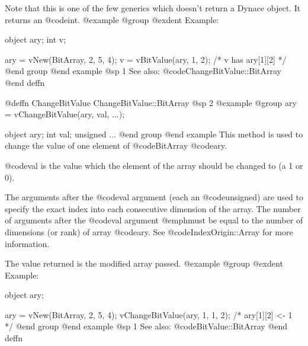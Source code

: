 Note that this is one of the few generics which doesn't return a Dynace
object.  It returns an @code{int}.
@example
@group
@exdent Example:

object  ary;
int     v;

ary = vNew(BitArray, 2, 5, 4);
v = vBitValue(ary, 1, 2);
/*  v has ary[1][2]  */
@end group
@end example
@sp 1
See also:  @code{ChangeBitValue::BitArray}
@end deffn








@deffn {ChangeBitValue} ChangeBitValue::BitArray
@sp 2
@example
@group
ary = vChangeBitValue(ary, val, ...);

object    ary;
int       val;
unsigned  ...
@end group
@end example
This method is used to change the value of one element of
@code{BitArray} @code{ary}.

@code{val} is the value which the element of the array should be changed
to (a 1 or 0).

The arguments after the @code{val} argument (each an @code{unsigned})
are used to specify the exact index into each consecutive dimension of
the array.  The number of arguments after the @code{val} argument
@emph{must} be equal to the number of dimensions (or rank) of array
@code{ary}.  See @code{IndexOrigin::Array} for more information.

The value returned is the modified array passed.
@example
@group
@exdent Example:

object  ary;

ary = vNew(BitArray, 2, 5, 4);
vChangeBitValue(ary, 1, 1, 2);
/*  ary[1][2] <- 1  */
@end group
@end example
@sp 1
See also:  @code{BitValue::BitArray}
@end deffn








